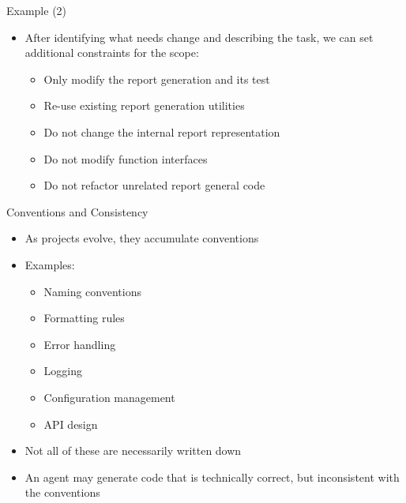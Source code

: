 \documentclass[
ps,
]{prosper}
\begin{document}
\begin{slide}{Example (2)}

\begin{itemize}

\item After identifying what needs change and describing the task, we
  can set additional constraints for the scope:

  \begin{itemize}
    
  \item Only modify the report generation and its test

  \item Re-use existing report generation utilities

  \item Do not change the internal report representation

  \item Do not modify function interfaces

  \item Do not refactor unrelated report general code
    
  \end{itemize}

\end{itemize}
  
\end{slide}



\begin{slide}{Conventions and Consistency}

\begin{itemize}

\item As projects evolve, they accumulate conventions

\item Examples:

  \begin{itemize}

  \item Naming conventions

  \item Formatting rules
    
  \item Error handling

  \item Logging

  \item Configuration management

  \item API design

  \end{itemize}
  
\item Not all of these are necessarily written down

\item An agent may generate code that is technically correct, but inconsistent
  with the conventions
  
\end{itemize}
  
\end{slide}
\end{document}
